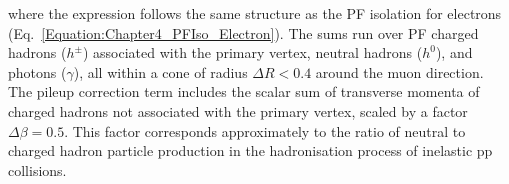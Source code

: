 where the expression follows the same structure as the PF isolation for electrons (Eq.~\ref{Equation:Chapter4_PFIso_Electron}). The sums run over PF charged hadrons ($h^\pm$) associated with the primary vertex, neutral hadrons ($h^0$), and photons ($\gamma$), all within a cone of radius $\Delta R < 0.4$ around the muon direction. The pileup correction term includes the scalar sum of transverse momenta of charged hadrons not associated with the primary vertex, scaled by a factor $\Delta \beta = 0.5$. This factor corresponds approximately to the ratio of neutral to charged hadron particle production in the hadronisation process of inelastic pp collisions.



